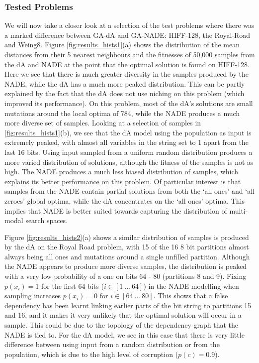 \documentclass[twoside]{article}
\begin{document}
\subsubsection{Tested Problems}

We will now take a closer look at a selection of the test problems where there was a marked difference between GA-dA and GA-NADE: HIFF-128, the Royal-Road and Weing8. Figure \ref{fig:results_hists1}(a) shows the distribution of the mean distances from their 5 nearest neighbours and the fitnesses of 50,000 samples from the dA and NADE at the point that the optimal solution is found on HIFF-128. Here we see that there is much greater diversity in the samples produced by the NADE, while the dA has a much more peaked distribution. This can be partly explained by the fact that the dA does not use niching on this problem (which improved its performance). On this problem, most of the dA's solutions are small mutations around the local optima of 784, while the NADE produces a much more diverse set of samples. Looking at a selection of samples in \ref{fig:results_hists1}(b), we see that the dA model using the population as input is extremely peaked, with almost all variables in the string set to 1 apart from the last 16 bits. Using input sampled from a uniform random distribution produces a more varied distribution of solutions, although the fitness of the samples is not as high. The NADE produces a much less biased distribution of samples, which explains its better performance on this problem. Of particular interest is that samples from the NADE contain partial solutions from both the `all ones' and `all zeroes' global optima, while the dA concentrates on the `all ones' optima. This implies that NADE is better suited towards capturing the distribution of multi-modal search spaces.

Figure \ref{fig:results_hists2}(a) shows a similar distribution of samples is produced by the dA on the Royal Road problem, with 15 of the 16 8 bit partitions almost always being all ones and mutations around a single unfilled partition. Although the NADE appears to produce more diverse samples, the distribution is peaked with a very low probability of a one on bits 64 - 80 (partitions 8 and 9). Fixing \(p(x_i)=1\) for the first 64 bits (\(i\in{[1\ ...\ 64]}\)) in the NADE modelling when sampling increases \(p(x_i)=0\) for \(i\in{[64\ ...\ 80]}\). This shows that a false dependency has been learnt linking earlier parts of the bit string to partitions 15 and 16, and it makes it very unlikely that the optimal solution will occur in a sample. This could be due to the topology of the dependency graph that the NADE is tied to. For the dA model, we see in this case that there is very little difference between using input from a random distribution or from the population, which is due to the high level of corruption (\(p(c)=0.9\)).
\end{document}
